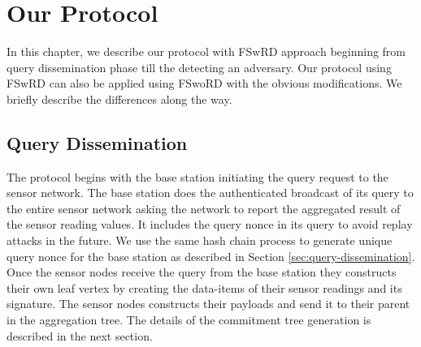 \chapter{Our Protocol}
	In this chapter, we describe our protocol with FSwRD approach beginning from query dissemination phase till the detecting an adversary.
	Our protocol using FSwRD can also be applied using FSwoRD with the obvious modifications. 
	We briefly describe the differences along the way.


\section{Query Dissemination}
	The protocol begins with the base station initiating the query request to the sensor network.
	The base station does the authenticated broadcast of its query to the entire sensor network asking the network to report the aggregated result of the sensor reading values.
	It includes the query nonce in its query to avoid replay attacks in the future. 
	We use the same hash chain process to generate unique query nonce for the base station as described in Section \ref{sec:query-dissemination}.
	Once the sensor nodes receive the query from the base station they constructs their own leaf vertex by creating the data-items of their sensor readings and its signature.
	The sensor nodes constructs their payloads and send it to their parent in the aggregation tree. 
	The details of the commitment tree generation is described in the next section.

